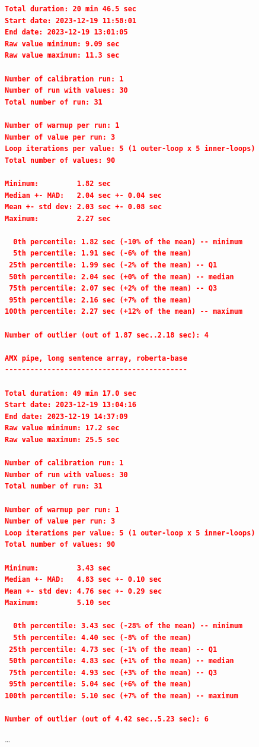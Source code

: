 \begin{lstlisting}[language=json]
Total duration: 20 min 46.5 sec
Start date: 2023-12-19 11:58:01
End date: 2023-12-19 13:01:05
Raw value minimum: 9.09 sec
Raw value maximum: 11.3 sec

Number of calibration run: 1
Number of run with values: 30
Total number of run: 31

Number of warmup per run: 1
Number of value per run: 3
Loop iterations per value: 5 (1 outer-loop x 5 inner-loops)
Total number of values: 90

Minimum:         1.82 sec
Median +- MAD:   2.04 sec +- 0.04 sec
Mean +- std dev: 2.03 sec +- 0.08 sec
Maximum:         2.27 sec

  0th percentile: 1.82 sec (-10% of the mean) -- minimum
  5th percentile: 1.91 sec (-6% of the mean)
 25th percentile: 1.99 sec (-2% of the mean) -- Q1
 50th percentile: 2.04 sec (+0% of the mean) -- median
 75th percentile: 2.07 sec (+2% of the mean) -- Q3
 95th percentile: 2.16 sec (+7% of the mean)
100th percentile: 2.27 sec (+12% of the mean) -- maximum

Number of outlier (out of 1.87 sec..2.18 sec): 4

AMX pipe, long sentence array, roberta-base
-------------------------------------------

Total duration: 49 min 17.0 sec
Start date: 2023-12-19 13:04:16
End date: 2023-12-19 14:37:09
Raw value minimum: 17.2 sec
Raw value maximum: 25.5 sec

Number of calibration run: 1
Number of run with values: 30
Total number of run: 31

Number of warmup per run: 1
Number of value per run: 3
Loop iterations per value: 5 (1 outer-loop x 5 inner-loops)
Total number of values: 90

Minimum:         3.43 sec
Median +- MAD:   4.83 sec +- 0.10 sec
Mean +- std dev: 4.76 sec +- 0.29 sec
Maximum:         5.10 sec

  0th percentile: 3.43 sec (-28% of the mean) -- minimum
  5th percentile: 4.40 sec (-8% of the mean)
 25th percentile: 4.73 sec (-1% of the mean) -- Q1
 50th percentile: 4.83 sec (+1% of the mean) -- median
 75th percentile: 4.93 sec (+3% of the mean) -- Q3
 95th percentile: 5.04 sec (+6% of the mean)
100th percentile: 5.10 sec (+7% of the mean) -- maximum

Number of outlier (out of 4.42 sec..5.23 sec): 6
\end{lstlisting}

\dots
